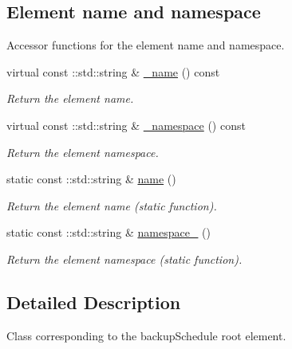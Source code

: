 \subsection*{Element name and namespace}
\label{_amgrpd4b5b61f6e07390f4af2465e04571f34}
Accessor functions for the element name and namespace. \begin{DoxyCompactItemize}
\item 
virtual const ::std::string \& \hyperlink{classopenstack_1_1xml_1_1BackupSchedule___a9ef18bd313336d0c6b9ead3d8b5180b4}{\_\-name} () const 
\begin{DoxyCompactList}\small\item\em Return the element name. \item\end{DoxyCompactList}\item 
virtual const ::std::string \& \hyperlink{classopenstack_1_1xml_1_1BackupSchedule___ac98dcab92ea1781423a3df3bd4ddb09f}{\_\-namespace} () const 
\begin{DoxyCompactList}\small\item\em Return the element namespace. \item\end{DoxyCompactList}\item 
static const ::std::string \& \hyperlink{classopenstack_1_1xml_1_1BackupSchedule___a2981e726aa8229003c62bc70007dcc8b}{name} ()
\begin{DoxyCompactList}\small\item\em Return the element name (static function). \item\end{DoxyCompactList}\item 
static const ::std::string \& \hyperlink{classopenstack_1_1xml_1_1BackupSchedule___aef3446d2b3f56b3216a719d67a5a077c}{namespace\_\-} ()
\begin{DoxyCompactList}\small\item\em Return the element namespace (static function). \item\end{DoxyCompactList}\end{DoxyCompactItemize}


\subsection{Detailed Description}
Class corresponding to the backupSchedule root element. 

